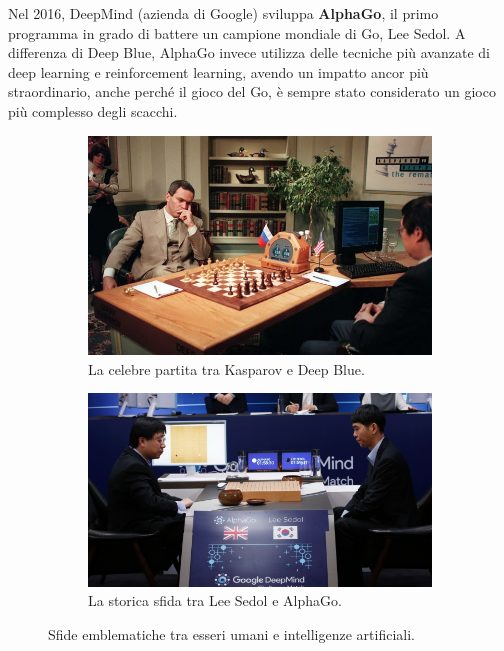 Nel 2016, DeepMind (azienda di Google) sviluppa \textbf{AlphaGo}, il primo programma in grado di battere un campione mondiale di Go, Lee Sedol. A differenza di Deep Blue, AlphaGo invece utilizza delle tecniche più avanzate di deep learning e reinforcement learning, avendo un impatto ancor più straordinario, anche perché il gioco del Go, è sempre stato considerato un gioco più complesso degli scacchi.

\begin{figure}[htbp]
    \centering
    \begin{tcolorbox}[colframe=cyan!50!black, colback=cyan!10, boxrule=0.8mm, top=2mm, bottom=2mm, left=2mm, right=2mm]
        \begin{subfigure}[b]{0.45\textwidth}
            \centering
            \includegraphics[width=\linewidth]{figure/GKDB.jpg}
            \caption{La celebre partita tra Kasparov e Deep Blue.}
            \label{fig:kasparovAndDeepBlue}
        \end{subfigure}
        \hspace{1cm}
        \begin{subfigure}[b]{0.45\textwidth}
            \centering
            \includegraphics[width=\linewidth]{figure/AGLS.jpg}
            \caption{La storica sfida tra Lee Sedol e AlphaGo.}
            \label{fig:leeSedolAndAlphaGo}
        \end{subfigure}
    \end{tcolorbox}
    \caption{Sfide emblematiche tra esseri umani e intelligenze artificiali.}
    \label{fig:kasparovAndLeeSedol}
\end{figure}

